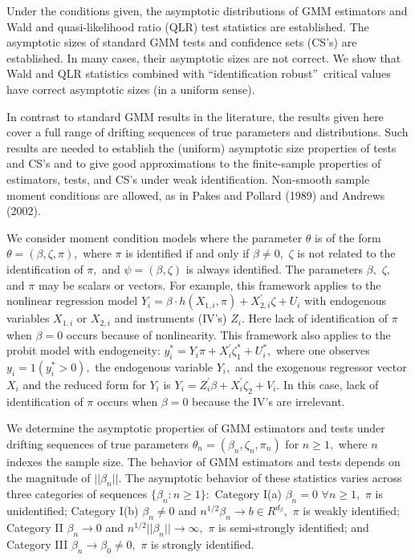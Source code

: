 \documentclass[12pt,thmsb,titlepage,final,oneside,letterpaper]{article}
\begin{document}
Under the conditions given, the asymptotic distributions of GMM estimators
and Wald and quasi-likelihood ratio (QLR) test statistics are established.
The asymptotic sizes of standard GMM tests and confidence sets (CS's) are
established. In many cases, their asymptotic sizes are not correct. We show
that Wald and QLR statistics combined with \textquotedblleft identification
robust\textquotedblright\ critical values have correct asymptotic sizes (in
a uniform sense).

In contrast to standard GMM results in the literature, the results given
here cover a full range of drifting sequences of true parameters and
distributions. Such results are needed to establish the (uniform) asymptotic
size properties of tests and CS's and to give good approximations to the
finite-sample properties of estimators, tests, and CS's under weak
identification. Non-smooth sample moment conditions are allowed, as in Pakes
and Pollard (1989) and Andrews (2002).

We consider moment condition models where the parameter $\theta $ is of the
form $\theta =(\beta ,\zeta ,\pi ),$ where $\pi $ is identified if and only
if $\beta \neq 0,$ $\zeta $ is not related to the identification of $\pi ,$
and $\psi =(\beta ,\zeta )$ is always identified. The parameters $\beta ,$ $%
\zeta ,$ and $\pi $ may be scalars or vectors. For example, this framework
applies to the nonlinear regression model $Y_{i}=\beta \cdot h\left(
X_{1,i},\pi \right) +X_{2,i}^{\prime }\zeta +U_{i}$ with endogenous
variables $X_{1,i}$ or $X_{2,i}$ and instruments (IV's) $Z_{i}.$ Here lack
of identification of $\pi $ when $\beta =0$ occurs because of nonlinearity.
This framework also applies to the probit model with endogeneity: $%
y_{i}^{\ast }=Y_{i}\pi +X_{i}^{\prime }\zeta _{1}^{\ast }+U_{i}^{\ast },$
where one observes $y_{i}=1(y_{i}^{\ast }>0),$ the endogenous variable $%
Y_{i},$ and the exogenous regressor vector $X_{i}$ and the reduced form for $%
Y_{i}$ is $Y_{i}=Z_{i}^{\prime }\beta +X_{i}^{\prime }\zeta _{2}+V_{i}.$ In
this case, lack of identification of $\pi $ occurs when $\beta =0$ because
the IV's are irrelevant.

We determine the asymptotic properties of GMM estimators and tests under
drifting sequences of true parameters $\theta _{n}=(\beta _{n},\zeta
_{n},\pi _{n})$ for $n\geq 1,$ where $n$ indexes the sample size. The
behavior of GMM estimators and tests depends on the magnitude of $||\beta
_{n}||.$ The asymptotic behavior of these statistics varies across three
categories of sequences $\{\beta _{n}:n\geq 1\}:$ Category I(a) $\beta
_{n}=0 $ $\forall n\geq 1,$ $\pi $ is unidentified; Category I(b) $\beta
_{n}\neq 0$ and $n^{1/2}\beta _{n}\rightarrow b\in R^{d_{\beta }},$ $\pi $
is weakly identified; Category II $\beta _{n}\rightarrow 0$ and $%
n^{1/2}||\beta _{n}||\rightarrow \infty ,$ $\pi $ is semi-strongly
identified; and Category III $\beta _{n}\rightarrow \beta _{0}\neq 0,$ $\pi $
is strongly identified.
\end{document}
